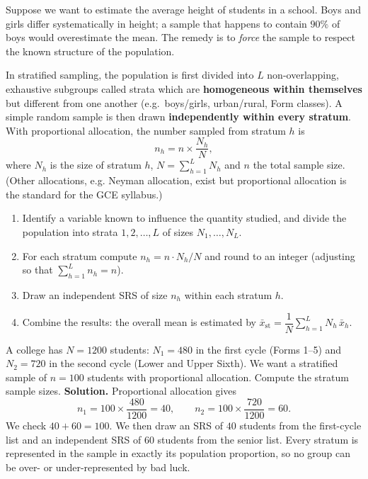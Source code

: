 \documentclass[11pt]{article}
\newcommand{\cle}[1]{{\popxbold\color{popdark}#1}}
\begin{document}
Suppose we want to estimate the average height of students in a school. Boys and girls differ systematically in height; a sample that happens to contain $90\%$ of boys would overestimate the mean. The remedy is to \emph{force} the sample to respect the known structure of the population.

\begin{definition}
In \cle{stratified sampling}, the population is first divided into $L$ non-overlapping, exhaustive subgroups called \cle{strata} which are \textbf{homogeneous within themselves} but different from one another (e.g.\ boys/girls, urban/rural, Form classes). A simple random sample is then drawn \textbf{independently within every stratum}. With \cle{proportional allocation}, the number sampled from stratum $h$ is
\[ n_h = n \times \frac{N_h}{N}, \]
where $N_h$ is the size of stratum $h$, $N = \sum_{h=1}^L N_h$ and $n$ the total sample size. (Other allocations, e.g. Neyman allocation, exist but proportional allocation is the standard for the GCE syllabus.)
\end{definition}

\begin{methode}
\begin{enumerate}
\item Identify a variable known to influence the quantity studied, and divide the population into strata $1, 2, \dots, L$ of sizes $N_1, \dots, N_L$.
\item For each stratum compute $n_h = n \cdot N_h / N$ and round to an integer (adjusting so that $\sum_{h=1}^L n_h = n$).
\item Draw an independent SRS of size $n_h$ within each stratum $h$.
\item Combine the results: the overall mean is estimated by $\bar{x}_{\mathrm{st}} = \dfrac{1}{N}\displaystyle\sum_{h=1}^L N_h\,\bar{x}_h$.
\end{enumerate}
\end{methode}

\begin{exoresolu}
A college has $N = 1200$ students: $N_1 = 480$ in the first cycle (Forms 1--5) and $N_2 = 720$ in the second cycle (Lower and Upper Sixth). We want a stratified sample of $n = 100$ students with proportional allocation. Compute the stratum sample sizes.
\tcblower
\textbf{Solution.} Proportional allocation gives
\[ n_1 = 100 \times \frac{480}{1200} = 40, \qquad n_2 = 100 \times \frac{720}{1200} = 60. \]
We check $40 + 60 = 100$. We then draw an SRS of $40$ students from the first-cycle list and an independent SRS of $60$ students from the senior list. Every stratum is represented in the sample in exactly its population proportion, so no group can be over- or under-represented by bad luck.
\end{exoresolu}
\end{document}
